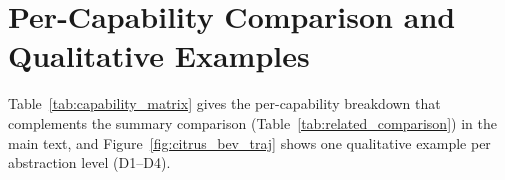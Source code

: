 \documentclass{article}
\begin{document}



\appendix
\section{Per-Capability Comparison and Qualitative Examples}
\label{app:extra}

Table~\ref{tab:capability_matrix} gives the per-capability breakdown that complements the
summary comparison (Table~\ref{tab:related_comparison}) in the main text, and
Figure~\ref{fig:citrus_bev_traj} shows one qualitative example per abstraction level (D1--D4).
\end{document}
